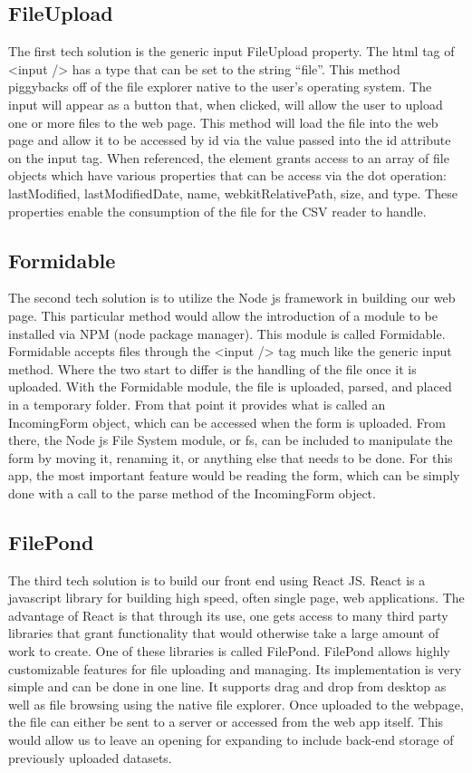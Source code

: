 \documentclass[journal,10pt,onecolumn,compsoc]{IEEEtran}
\begin{document}
\subsection{FileUpload}
The first tech solution is the generic input FileUpload property. The html tag of <input /> has a type that can be set to the string “file”. This method piggybacks off of the file explorer native to the user’s operating system. The input will appear as a button that, when clicked, will allow the user to upload one or more files to the web page. This method will load the file into the web page and allow it to be accessed by id via the value passed into the id attribute on the input tag. When referenced, the element grants access to an array of file objects which have various properties that can be access via the dot operation: lastModified, lastModifiedDate, name, webkitRelativePath, size, and type. These properties enable the consumption of the file for the CSV reader to handle.

\subsection{Formidable}
The second tech solution is to utilize the Node js framework in building our web page. This particular method would allow the introduction of a module to be installed via NPM (node package manager). This module is called Formidable. Formidable accepts files through the <input /> tag much like the generic input method. Where the two start to differ is the handling of the file once it is uploaded. With the Formidable module, the file is uploaded, parsed, and placed in a temporary folder. From that point it provides what is called an IncomingForm object, which can be accessed when the form is uploaded. From there, the Node js File System module, or fs, can be included to manipulate the form by moving it, renaming it, or anything else that needs to be done. For this app, the most important feature would be reading the form, which can be simply done with a call to the parse method of the IncomingForm object.

\subsection{FilePond}
The third tech solution is to build our front end using React JS. React is a javascript library for building high speed, often single page, web applications. The advantage of React is that through its use, one gets access to many third party libraries that grant functionality that would otherwise take a large amount of work to create. One of these libraries is called FilePond. FilePond allows highly customizable features for file uploading and managing. Its implementation is very simple and can be done in one line. It supports drag and drop from desktop as well as file browsing using the native file explorer. Once uploaded to the webpage, the file can either be sent to a server or accessed from the web app itself. This would allow us to leave an opening for expanding to include back-end storage of previously uploaded datasets.
\end{document}

